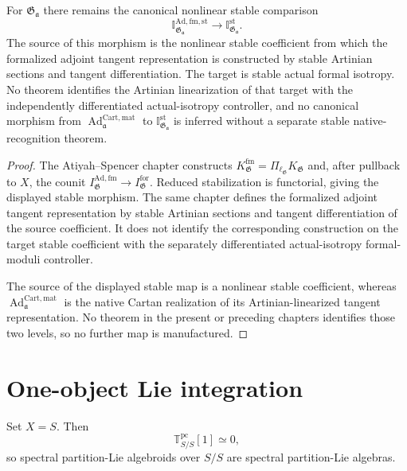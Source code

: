 \begin{proposition}
\label{prop:bnli-adjoint-stable-counit}
For $\mathfrak G_{\mathfrak a}$ there remains the canonical nonlinear stable
comparison
\[
\boxed{
    \mathbb I^{\mathrm{Ad,fm,st}}_{\mathfrak G_{\mathfrak a}}
    \longrightarrow
    \mathbb I^{\mathrm{st}}_{\mathfrak G_{\mathfrak a}}.}
\]
The source of this morphism is the nonlinear stable coefficient from which the
formalized adjoint tangent representation is constructed by stable Artinian
sections and tangent differentiation.  The target is stable actual formal
isotropy.  No theorem identifies the Artinian linearization of that target with
the independently differentiated actual-isotropy controller, and no canonical
morphism from $\operatorname{Ad}^{\mathrm{Cart,mat}}_{\mathfrak a}$ to
$\mathbb I^{\mathrm{st}}_{\mathfrak G_{\mathfrak a}}$ is inferred without a
separate stable native-recognition theorem.
\end{proposition}

\begin{proof}
The Atiyah--Spencer chapter constructs
$K_{\mathfrak G}^{\mathrm{fm}}=\Pi_{\ell_{\mathfrak G}}K_{\mathfrak G}$ and,
after pullback to $X$, the counit
$I_{\mathfrak G}^{\mathrm{Ad,fm}}\to I_{\mathfrak G}^{\mathrm{for}}$.
Reduced stabilization is functorial, giving the displayed stable morphism.
The same chapter defines the formalized adjoint tangent representation by
stable Artinian sections and tangent differentiation of the source coefficient.
It does not identify the corresponding construction on the target stable
coefficient with the separately differentiated actual-isotropy formal-moduli
controller.

The source of the displayed stable map is a nonlinear stable coefficient,
whereas
$\operatorname{Ad}^{\mathrm{Cart,mat}}_{\mathfrak a}$ is the native Cartan
realization of its Artinian-linearized tangent representation.  No theorem in
the present or preceding chapters identifies those two levels, so no further
map is manufactured.
\end{proof}

\section{One-object Lie integration}
\label{sec:bnli-one-object}

Set $X=S$.  Then
\[
    \mathbb T^{\mathrm{pc}}_{S/S}[1]\simeq0,
\]
so spectral partition-Lie algebroids over $S/S$ are spectral partition-Lie
algebras.

